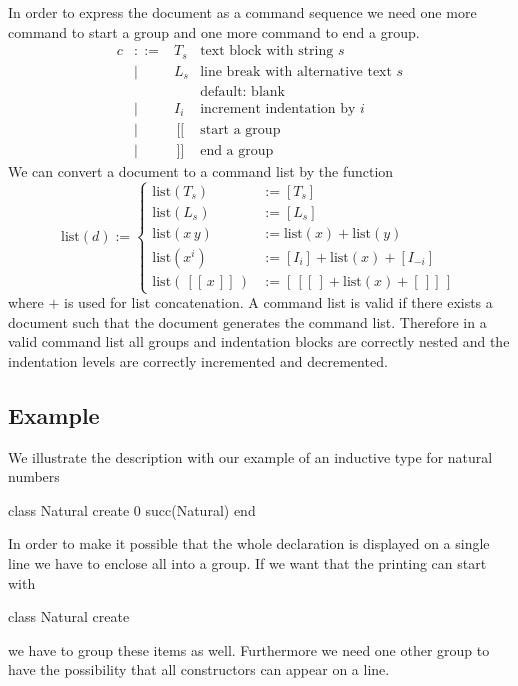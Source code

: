 \documentclass[12pt]{article}
\def\cs{\text{cs}}
\def\GS{\,[\![\,}
\def\GE{\,]\!]\,}
\newcommand{\group}[1]{\GS #1 \GE}
\begin{document}
In order to express the document as a command sequence we need one more
command to start a group and one more command to end a group.
%
$$
\begin{array}{llll}
  c & ::= & T_s         & \text{text block with string } s
  \\
    & \mid &  L_s       & \text{line break with alternative text } s
  \\ & & &\text{default: blank}
  \\
    & \mid &  I_i     & \text{increment indentation by } i
  \\
    & \mid &  \GS       & \text{start a group }
  \\
    & \mid &  \GE       & \text{end a group }
\end{array}
$$%
We can convert a document to a command list by the function
{\def\cs{\text{list}}
  $$
  \cs(d) :=
  \begin{cases}
    \cs(T_s) & := [T_s]
    \\
    \cs(L_s) & := [ L_s ]
    \\
    \cs(x\, y) & := \cs(x) + \cs(y)
    \\
    \cs(x^i)   & := [I_i] + \cs(x) + [I_{-i}]
    \\
    \cs(\group{x})  & := [\GS] + \cs(x) + [\GE]
  \end{cases}
  $$%
  where $+$ is used for list concatenation.
}
%
A command list is valid if there exists a document such that the document
generates the command list. Therefore in a valid command list all groups and
indentation blocks are correctly nested and the indentation levels are
correctly incremented and decremented.


\subsection{Example}

We illustrate the description with our example of an inductive type for
natural numbers
\begin{alba}
    class
        Natural
    create
        0
        succ(Natural)
    end
\end{alba}
In order to make it possible that the whole declaration is displayed on a
single line we have to enclose all into a group. If we want that the printing
can start with
\begin{alba}
    class Natural create
\end{alba}
%
we have to group these items as well. Furthermore we need one other group to
have the possibility that all constructors can appear on a line.
\end{document}

